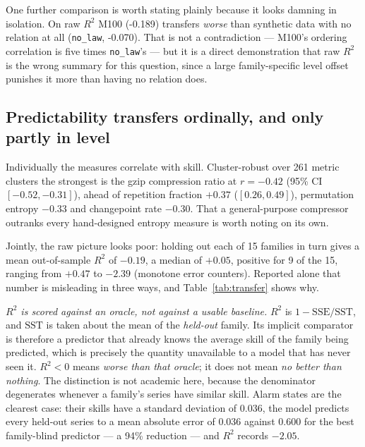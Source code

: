 \documentclass[11pt,a4paper]{article}
\newcommand{\num}[1]{#1}
\begin{document}
One further comparison is worth stating plainly because it looks damning in
isolation. On raw \(R^2\) M100 (\num{-0.189}) transfers \emph{worse} than
synthetic data with no relation at all (\texttt{no\_law}, \num{-0.070}). That
is not a contradiction --- M100's ordering correlation is five times
\texttt{no\_law}'s --- but it is a direct demonstration that raw \(R^2\) is the
wrong summary for this question, since a large family-specific level offset
punishes it more than having no relation does.

\subsection{Predictability transfers ordinally, and only partly in level}
\label{sec:linking}

Individually the measures correlate with skill. Cluster-robust over \num{261}
metric clusters the strongest is the gzip compression ratio at \(r=-0.42\)
(95\% CI \([-0.52,-0.31]\)), ahead of repetition fraction \(+0.37\)
(\([0.26,0.49]\)), permutation entropy \(-0.33\) and changepoint rate
\(-0.30\). That a general-purpose compressor outranks every hand-designed
entropy measure is worth noting on its own.

Jointly, the raw picture looks poor: holding out each of \num{15} families in
turn gives a mean out-of-sample \(R^2\) of \(-0.19\), a median of \(+0.05\),
positive for \num{9} of the \num{15}, ranging from \(+0.47\) to \(-2.39\)
(monotone error counters). Reported alone that number is
misleading in three ways, and Table~\ref{tab:transfer} shows why.

\emph{\(R^2\) is scored against an oracle, not against a usable baseline.}
\(R^2\) is \(1-\mathrm{SSE}/\mathrm{SST}\), and \(\mathrm{SST}\) is taken about
the mean of the \emph{held-out} family. Its implicit comparator is therefore a
predictor that already knows the average skill of the family being predicted,
which is precisely the quantity unavailable to a model that has never seen it.
\(R^2<0\) means \emph{worse than that oracle}; it does not mean \emph{no better
than nothing}. The distinction is not academic here, because the denominator
degenerates whenever a family's series have similar skill. Alarm states are the
clearest case: their skills have a standard deviation of \num{0.036}, the model
predicts every held-out series to a mean absolute error of \num{0.036} against
\num{0.600} for the best family-blind predictor --- a \num{94}\% reduction ---
and \(R^2\) records \(-2.05\).
\end{document}
